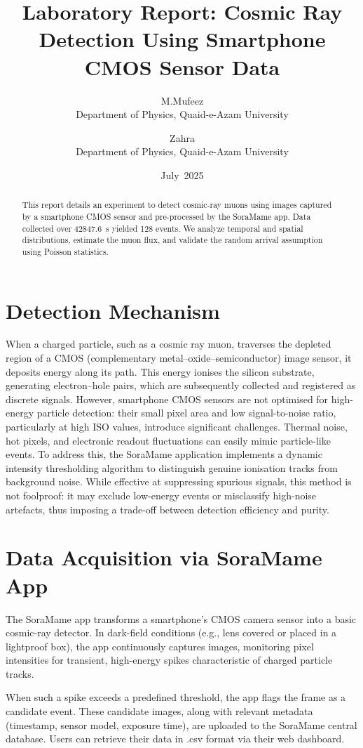 \documentclass[12pt]{article}
\title{\textbf{Laboratory Report: Cosmic Ray Detection Using Smartphone CMOS Sensor Data}}
\author{
	M.Mufeez\\
	Department of Physics, Quaid-e-Azam University
	\and
	Zahra\\
	Department of Physics, Quaid-e-Azam University
}
\date{July 2025}
\date{}
\begin{document}
	\maketitle	
	
	\begin{abstract}
		This report details an experiment to detect cosmic-ray muons using images captured by a smartphone CMOS sensor and pre-processed by the SoraMame app. Data collected over \SI{42847.6}{\second} yielded \num{128} events. We analyze temporal and spatial distributions, estimate the muon flux, and validate the random arrival assumption using Poisson statistics.
	\end{abstract}
	

	\section{Detection Mechanism}
	When a charged particle, such as a cosmic ray muon, traverses the depleted region of a CMOS (complementary metal–oxide–semiconductor) image sensor, it deposits energy along its path. This energy ionises the silicon substrate, generating electron–hole pairs, which are subsequently collected and registered as discrete signals. However, smartphone CMOS sensors are not optimised for high-energy particle detection: their small pixel area and low signal-to-noise ratio, particularly at high ISO values, introduce significant challenges. Thermal noise, hot pixels, and electronic readout fluctuations can easily mimic particle-like events. To address this, the SoraMame application implements a dynamic intensity thresholding algorithm to distinguish genuine ionisation tracks from background noise. While effective at suppressing spurious signals, this method is not foolproof: it may exclude low-energy events or misclassify high-noise artefacts, thus imposing a trade-off between detection efficiency and purity.
	
	\section{Data Acquisition via SoraMame App}
	
	The SoraMame app transforms a smartphone's CMOS camera sensor into a basic cosmic-ray detector. In dark-field conditions (e.g., lens covered or placed in a lightproof box), the app continuously captures images, monitoring pixel intensities for transient, high-energy spikes characteristic of charged particle tracks.
	
	When such a spike exceeds a predefined threshold, the app flags the frame as a candidate event. These candidate images, along with relevant metadata (timestamp, sensor model, exposure time), are uploaded to the SoraMame central database. Users can retrieve their data in .csv format via their web dashboard.
	
\end{document}
